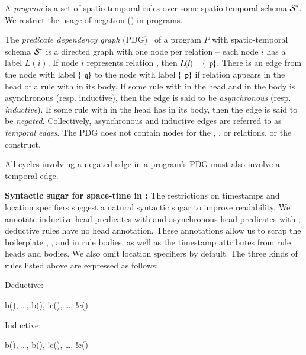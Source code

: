 A \lang \emph{program} is a set of spatio-temporal rules over some spatio-temporal schema $\stschema$.  We restrict the usage of negation (\dedalus{!}) in \lang programs.

The {\em predicate dependency graph} (PDG)~\cite{ullmanbook} of a \lang program $P$ with spatio-temporal schema $\stschema$ is a directed graph with one node per relation -- each node $i$ has a label $L(i)$.  If node $i$ represents relation , then $L(i) = \{\dedalus{p}\}$.  There is an edge from the node with label $\{\dedalus{q}\}$ to the node with label $\{\dedalus{p}\}$ if relation  appears in the head of a rule with  in its body.  If some rule with  in the head and  in the body is asynchronous (resp. inductive), then the edge is said to be {\em asynchronous} (resp. {\em inductive}).  If some rule with  in the head has  in its body, then the edge is said to be {\em negated}.  Collectively, asynchronous and inductive edges are referred to as {\em temporal edges}.  The PDG does not contain nodes for the , , or \dedalus{<} relations, or the  construct.

All cycles involving a negated edge in a \lang program's PDG must also involve a temporal edge.

\noindent
\textbf{Syntactic sugar for space-time in \lang:}
The restrictions on timestamps and location specifiers suggest a natural
syntactic sugar to improve readability.  We annotate inductive head predicates
with  and asynchronous head predicates with ;
deductive rules have no head annotation.  These annotations allow us to scrap
the boilerplate , ,  and
 in rule bodies, as well as the timestamp attributes from rule
heads and bodies.  We also omit location specifiers by default. The three kinds of rules listed above are expressed as
follows:

Deductive:

\begin{Drules}
        {b(), \ldots, b(), !c(), \ldots, !c()}
\end{Drules}

Inductive:

\begin{Drules}
        {b(), \ldots, b(), !c(), \ldots, !c()}
\end{Drules}

